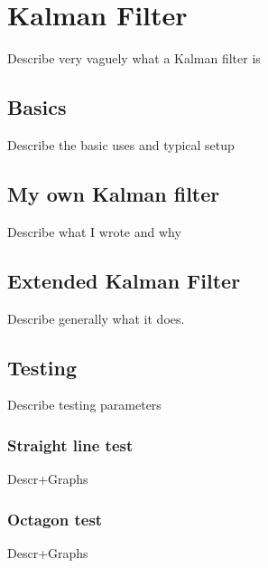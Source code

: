 \chapter{Kalman Filter}\label{cha:KalmanFilter}

Describe very vaguely what a Kalman filter is

\section{Basics}
Describe the basic uses and typical setup

\section{My own Kalman filter}
Describe what I wrote and why

\section{Extended Kalman Filter}
Describe generally what it does.

\section{Testing}
Describe testing parameters

\subsection{Straight line test}
Descr+Graphs

\subsection{Octagon test}
Descr+Graphs
